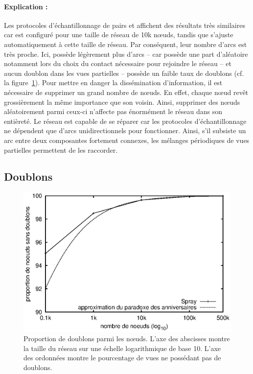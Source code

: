 \paragraph{Explication :} Les protocoles d'échantillonnage de pairs \CYCLON et
\SPRAY affichent des résultats très similaires car \CYCLON est configuré pour
une taille de réseau de 10k nœuds, tandis que \SPRAY s'ajuste automatiquement à
cette taille de réseau. Par conséquent, leur nombre d'arcs est très proche. Ici,
\CYCLON possède légèrement plus d'arcs -- car \SPRAY possède une part
d'aléatoire notamment lors du choix du contact nécessaire pour rejoindre le
réseau -- et aucun doublon dans les vues partielles -- \SPRAY possède un faible
taux de doublons (cf. la figure~\ref{net:fig:duplicates}). Pour mettre en danger
la dissémination d'information, il est nécessaire de supprimer un grand nombre
de nœuds. En effet, chaque nœud revêt grossièrement la même importance que son
voisin. Ainsi, supprimer des nœuds aléatoirement parmi ceux-ci n'affecte pas
énormément le réseau dans son entièreté. Le réseau est capable de se réparer car
les protocoles d'échantillonnage ne dépendent que d'arcs unidirectionnels pour
fonctionner. Ainsi, s'il subsiste un arc entre deux composantes fortement
connexes, les mélanges périodiques de vues partielles permettent de les
raccorder.


\subsection{Doublons}
\label{net:subsec:duplicates}

\begin{figure}
  \centering
  \includegraphics[width=.8\textwidth]{img/spray/duplicates.eps}
  \caption[Proportion de redondance dans \SPRAY]{\label{net:fig:duplicates}
    Proportion de doublons parmi les nœuds.  L'axe des abscisses montre la
    taille du réseau sur une échelle logarithmique de base 10. L'axe des
    ordonnées montre le pourcentage de vues ne possédant pas de doublons.}
\end{figure}

